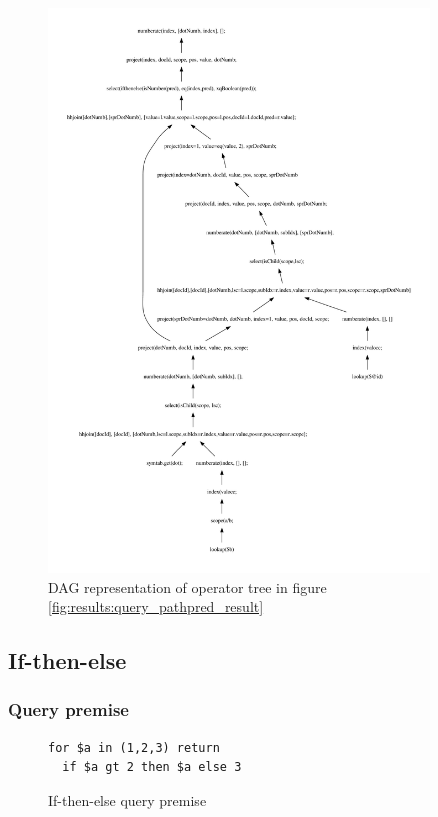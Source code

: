 \newpage
\begin{figure}[!htp]
\begin{center}
  \includegraphics[width=0.9\textwidth]{img/graphs/TD_patExprPred_dag}
  \caption{DAG representation of operator tree in figure
  \ref{fig:results:query_pathpred_result}}
  \label{fig:results:query_pathpred_result_dag}
\end{center}
\end{figure}

\subsection{If-then-else}
\subsubsection{Query premise}
\begin{figure}[!htp]
\begin{center}
\begin{Verbatim}
for $a in (1,2,3) return
  if $a gt 2 then $a else 3
\end{Verbatim}
  \caption{If-then-else query premise}
  \label{fig:results:query_ifthenelse}
\end{center}
\end{figure}

